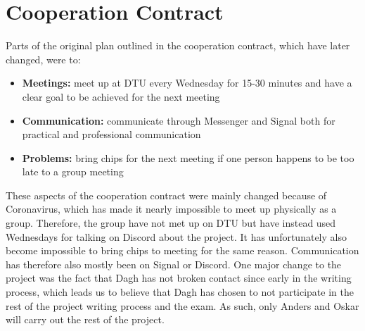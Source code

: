 \documentclass[11pt, fleqn]{article}
\begin{document}
	\section*{Cooperation Contract}
	Parts of the original plan outlined in the cooperation contract, which have later changed, were to:
	\begin{itemize}
		\item \textbf{Meetings:} meet up at DTU every Wednesday for 15-30 minutes and have a clear goal to be achieved for the next meeting
		\item \textbf{Communication:} communicate through Messenger and Signal both for practical and professional communication
		\item \textbf{Problems:} bring chips for the next meeting if one person happens to be too late to a group meeting
	\end{itemize}
	
	These aspects of the cooperation contract were mainly changed because of Coronavirus, which has made it nearly impossible to meet up physically as a group. Therefore, the group have not met up on DTU but have instead used Wednesdays for talking on Discord about the project. It has unfortunately also become impossible to bring chips to meeting for the same reason. Communication has therefore also mostly been on Signal or Discord. One major change to the project was the fact that Dagh has not broken contact since early in the writing process, which leads us to believe that Dagh has chosen to not participate in the rest of the project writing process and the exam. As such, only Anders and Oskar will carry out the rest of the project.
	
\end{document}
